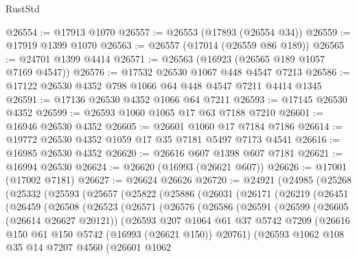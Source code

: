\begin{lexlean}{RustStd}
\begin{coremodule}
@26554 := @17913 @1070
@26557 := @26553 (@17893 (@26554 @34))
@26559 := @17919 @1399 @1070
@26563 := @26557 (@17014 (@26559 @86 @189))
@26565 := @24701 @1399 @4414
@26571 := @26563 (@16923 (@26565 @189 @1057 @7169 @4547))
@26576 := @17532 @26530 @1067 @448 @4547 @7213
@26586 := @17122 @26530 @4352 @798 @1066 @64 @448 @4547 @7211 @4414 @1345
@26591 := @17136 @26530 @4352 @1066 @64 @7211
@26593 := @17145 @26530 @4352
@26599 := @26593 @1060 @1065 @17 @63 @7188 @7210
@26601 := @16946 @26530 @4352
@26605 := @26601 @1060 @17 @7184 @7186
@26614 := @19772 @26530 @4352 @1059 @17 @35 @7181 @5497 @7173 @4541
@26616 := @16985 @26530 @4352
@26620 := @26616 @607 @1398 @607 @7181
@26621 := @16994 @26530
@26624 := @26620 (@16993 (@26621 @607))
@26626 := @17001 (@17002 @7181)
@26627 := @26624 @26626
@26720 := @24921
    (@24985
      (@25268
        (@25332
          (@25593
            (@25657
              (@25822
                (@25886
                  (@26031
                    (@26171
                      (@26219
                        (@26451
                          (@26459
                            (@26508
                              (@26523
                                (@26571
                                  (@26576
                                    (@26586
                                      (@26591
                                        (@26599
                                          (@26605 (@26614 @26627 @20121))
                                          (@26593
                                            @207
                                            @1064
                                            @61
                                            @37
                                            @5742
                                            @7209
                                            (@26616
                                              @150
                                              @61
                                              @150
                                              @5742
                                              (@16993 (@26621 @150))
                                              @20761)
                                            (@26593
                                              @1062
                                              @108
                                              @35
                                              @14
                                              @7207
                                              @4560
                                              (@26601
                                                @1062

\end{coremodule}
\end{lexlean}
